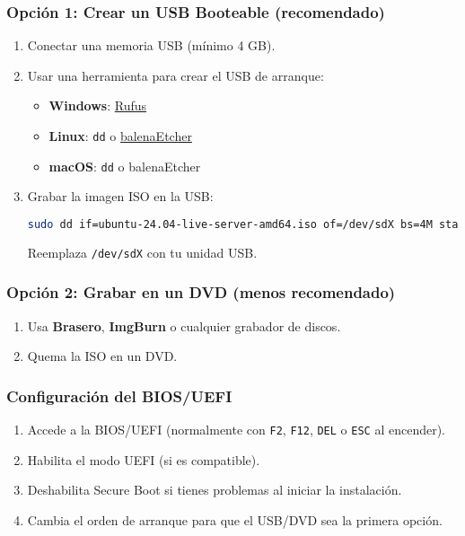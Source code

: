 \documentclass{article}
\begin{document}
\subsubsection{Opción 1: Crear un USB Booteable (recomendado)}
\begin{enumerate}
    \item Conectar una memoria USB (mínimo 4 GB).
    \item Usar una herramienta para crear el USB de arranque:
    \begin{itemize}
        \item \textbf{Windows}: \href{https://rufus.ie}{Rufus}
        \item \textbf{Linux}: \texttt{dd} o \href{https://www.balena.io/etcher/}{balenaEtcher}
        \item \textbf{macOS}: \texttt{dd} o balenaEtcher
    \end{itemize}
    \item Grabar la imagen ISO en la USB:
    \begin{lstlisting}[language=bash]
    sudo dd if=ubuntu-24.04-live-server-amd64.iso of=/dev/sdX bs=4M status=progress
    \end{lstlisting}
    Reemplaza \texttt{/dev/sdX} con tu unidad USB.
\end{enumerate}

\subsubsection{Opción 2: Grabar en un DVD (menos recomendado)}
\begin{enumerate}
    \item Usa \textbf{Brasero}, \textbf{ImgBurn} o cualquier grabador de discos.
    \item Quema la ISO en un DVD.
\end{enumerate}

\subsubsection{Configuración del BIOS/UEFI}
\begin{enumerate}
    \item Accede a la BIOS/UEFI (normalmente con \texttt{F2}, \texttt{F12}, \texttt{DEL} o \texttt{ESC} al encender).
    \item Habilita el modo UEFI (si es compatible).
    \item Deshabilita Secure Boot si tienes problemas al iniciar la instalación.
    \item Cambia el orden de arranque para que el USB/DVD sea la primera opción.
\end{enumerate}
\end{document}
